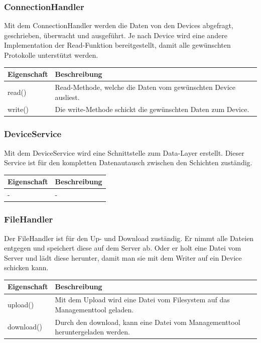 \subsubsection{ConnectionHandler}
Mit dem ConnectionHandler werden die Daten von den Devices abgefragt, geschrieben, überwacht und ausgeführt. Je nach Device wird eine andere Implementation der Read-Funktion bereitgestellt, damit alle gewünschten Protokolle unterstützt werden.
\noindent \begin{table}[H]
\centering
    \begin{tabular}{@{}l p{14.1cm} @{}}\toprule    
    {Eigenschaft} & {Beschreibung}\\ \midrule      
    read() & Read-Methode, welche die Daten vom gewünschten Device ausliest.\\
    write() & Die write-Methode schickt die gewünschten Daten zum Device. \\
    \bottomrule
    \end{tabular}
\end{table}



\subsubsection{DeviceService}
Mit dem DeviceService wird eine Schnittstelle zum Data-Layer erstellt. Dieser Service ist für den kompletten Datenautausch zwischen den Schichten zuständig.\begin{table}[H]
\centering
    \begin{tabular}{@{}l p{14.1cm} @{}}\toprule    
    {Eigenschaft} & {Beschreibung}\\ \midrule 
    - & -
    \bottomrule
    \end{tabular}
\end{table}




\subsubsection{FileHandler}
Der FileHandler ist für den Up- und Download zuständig. Er nimmt alle Dateien entgegen und speichert diese auf dem Server ab. Oder er holt eine Datei vom Server und lädt diese herunter, damit man sie mit dem Writer auf ein Device schicken kann.
\begin{table}[H]
\centering
    \begin{tabular}{@{}l p{14.1cm} @{}}\toprule    
    {Eigenschaft} & {Beschreibung}\\ \midrule 
    upload() & Mit dem Upload wird eine Datei vom Filesystem auf das Managementtool geladen. \\
    download() & Durch den download, kann eine Datei vom Managementtool heruntergeladen werden. \\
    \bottomrule
    \end{tabular}
\end{table}

